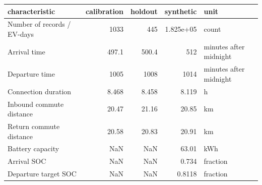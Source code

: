 \begin{tabular}{lrrrl}
\toprule
characteristic & calibration & holdout & synthetic & unit \\
\midrule
Number of records / EV-days & 1033 & 445 & 1.825e+05 & count \\
Arrival time & 497.1 & 500.4 & 512 & minutes after midnight \\
Departure time & 1005 & 1008 & 1014 & minutes after midnight \\
Connection duration & 8.468 & 8.458 & 8.119 & h \\
Inbound commute distance & 20.47 & 21.16 & 20.85 & km \\
Return commute distance & 20.58 & 20.83 & 20.91 & km \\
Battery capacity & NaN & NaN & 63.01 & kWh \\
Arrival SOC & NaN & NaN & 0.734 & fraction \\
Departure target SOC & NaN & NaN & 0.8118 & fraction \\
\bottomrule
\end{tabular}
